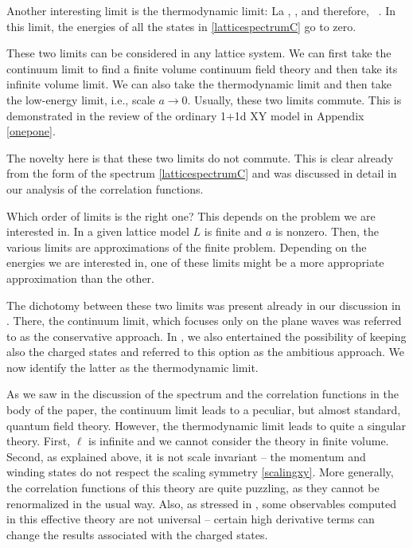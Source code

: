\documentclass[12pt]{article}
\numberwithin{equation}{section}
\begin{document}
Another interesting limit is the thermodynamic limit:
\ie
L\to \infty {}\quad a \quad ,  \quad , 
\fe
and therefore,
\ie
\ell \to \infty~.
\fe
In this limit, the energies of all the states in \eqref{latticespectrumC} go to zero.

These two limits can be considered in any lattice system.  We can first take the continuum limit to find a finite volume continuum field theory and then take its infinite volume limit.  We can also take the thermodynamic limit and then take the low-energy limit, i.e., scale $a\to 0$.  Usually, these two limits commute.  This is demonstrated in the review of the ordinary 1+1d XY model in Appendix \ref{onepone}.

The novelty here is that these two limits do not commute.  This is clear already from the form of the spectrum \eqref{latticespectrumC} and was discussed in detail in our analysis of the correlation functions.

Which order of limits is the right one?  This depends on the problem we are interested in.  In a given lattice model $L$ is finite and $a$ is nonzero.  Then, the various limits are approximations of the finite problem.  Depending on the energies we are interested in, one of these limits might be a more appropriate approximation than the other.

The dichotomy between these two limits was present already in our discussion in \cite{paper1}.  There, the continuum limit, which focuses only on the plane waves was referred to as the conservative approach.  In \cite{paper1}, we also entertained the possibility of keeping also the charged states and referred to this option as the ambitious approach.  We now identify the latter as the thermodynamic limit.

As we saw in the discussion of the spectrum and the correlation functions in the body of the paper, the continuum limit leads to a peculiar, but almost standard, quantum field theory.  However, the thermodynamic limit leads to quite a singular theory.  First, $\ell$ is infinite and we cannot consider the theory in finite volume.  Second, as explained above, it is not scale invariant -- the momentum and winding states do not respect the scaling symmetry \eqref{scalingxy}.  More generally, the correlation functions of this theory are quite puzzling, as they cannot be renormalized in the usual way.  Also, as stressed in \cite{paper1}, some observables computed in this effective theory are not universal -- certain high derivative terms can change the results associated with the charged states.
\end{document}
